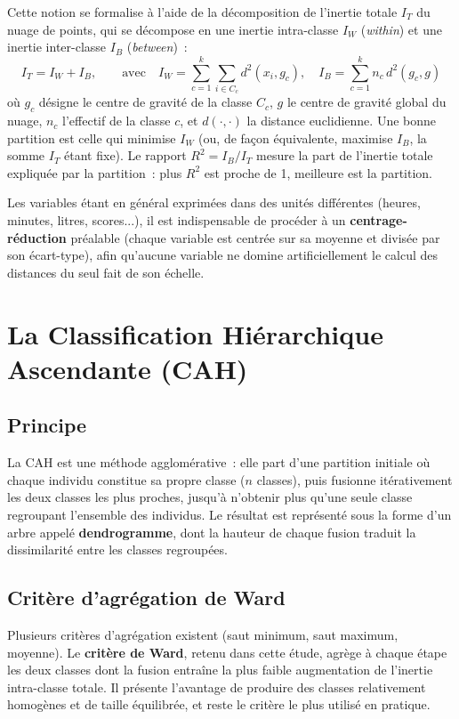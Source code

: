 \documentclass[11pt,a4paper,oneside]{book}
\begin{document}
Cette notion se formalise à l'aide de la décomposition de l'inertie totale $I_T$ du nuage de points, qui se décompose en une inertie intra-classe $I_W$ (\emph{within}) et une inertie inter-classe $I_B$ (\emph{between})~:
\begin{equation}
I_T = I_W + I_B, \qquad \text{avec} \quad I_W = \sum_{c=1}^{k}\sum_{i \in C_c} d^2(x_i, g_c), \quad I_B = \sum_{c=1}^{k} n_c\, d^2(g_c, g)
\end{equation}
où $g_c$ désigne le centre de gravité de la classe $C_c$, $g$ le centre de gravité global du nuage, $n_c$ l'effectif de la classe $c$, et $d(\cdot,\cdot)$ la distance euclidienne. Une bonne partition est celle qui minimise $I_W$ (ou, de façon équivalente, maximise $I_B$, la somme $I_T$ étant fixe). Le rapport $R^2 = I_B / I_T$ mesure la part de l'inertie totale expliquée par la partition~: plus $R^2$ est proche de 1, meilleure est la partition.

Les variables étant en général exprimées dans des unités différentes (heures, minutes, litres, scores...), il est indispensable de procéder à un \textbf{centrage-réduction} préalable (chaque variable est centrée sur sa moyenne et divisée par son écart-type), afin qu'aucune variable ne domine artificiellement le calcul des distances du seul fait de son échelle.

\section{La Classification Hiérarchique Ascendante (CAH)}

\subsection{Principe}
La CAH est une méthode agglomérative~: elle part d'une partition initiale où chaque individu constitue sa propre classe ($n$ classes), puis fusionne itérativement les deux classes les plus proches, jusqu'à n'obtenir plus qu'une seule classe regroupant l'ensemble des individus. Le résultat est représenté sous la forme d'un arbre appelé \textbf{dendrogramme}, dont la hauteur de chaque fusion traduit la dissimilarité entre les classes regroupées.

\subsection{Critère d'agrégation de Ward}
Plusieurs critères d'agrégation existent (saut minimum, saut maximum, moyenne). Le \textbf{critère de Ward}, retenu dans cette étude, agrège à chaque étape les deux classes dont la fusion entraîne la plus faible augmentation de l'inertie intra-classe totale. Il présente l'avantage de produire des classes relativement homogènes et de taille équilibrée, et reste le critère le plus utilisé en pratique.
\end{document}
